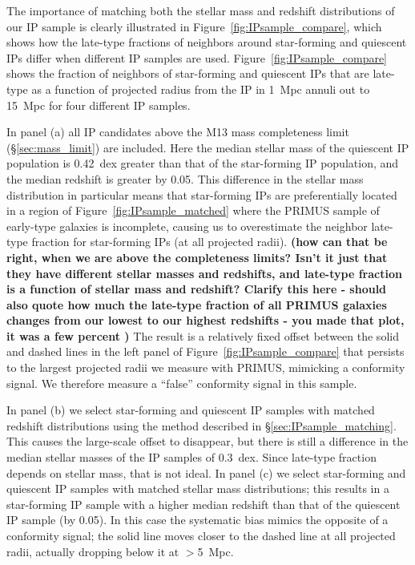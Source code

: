 The importance of matching both the stellar mass and redshift distributions of our 
IP sample is clearly illustrated in Figure~\ref{fig:IPsample_compare}, which shows 
how the late-type fractions of neighbors around star-forming and quiescent IPs 
differ when different IP samples are used.
Figure~\ref{fig:IPsample_compare} shows the fraction of neighbors of star-forming 
and quiescent IPs that are late-type as a function of projected radius from the 
IP in 1~Mpc annuli out to 15~Mpc for four different IP samples.
%

In panel (a) all IP candidates above the M13 mass completeness limit 
(\S\ref{sec:mass_limit}) are included.
Here the median stellar mass of the quiescent IP population is 0.42~dex greater 
than that of the star-forming IP population, and the median redshift is greater 
by 0.05.
This difference in the stellar mass distribution in particular means that 
star-forming IPs are preferentially located in a region of 
Figure~\ref{fig:IPsample_matched} where the PRIMUS sample of
early-type galaxies is incomplete, causing us to overestimate the neighbor late-type fraction for star-forming IPs (at all projected radii).
{\bf(how can that be right, when we are above the completeness limits?  Isn't it 
just that they have different stellar masses and redshifts, and late-type fraction is a function of stellar mass 
and redshift? Clarify this here - should also quote how much the late-type fraction of all PRIMUS galaxies changes from our lowest to our highest redshifts - you made that plot, it was a few percent )}
The result is a relatively fixed offset between the solid and dashed lines in the 
left panel of Figure~\ref{fig:IPsample_compare} that persists to the largest 
projected radii we measure with PRIMUS, mimicking a conformity signal.  We therefore
measure a ``false'' conformity signal in this sample.

In panel (b) we select star-forming and quiescent IP samples with matched redshift 
distributions using the method described in \S\ref{sec:IPsample_matching}.  This 
causes the large-scale offset to disappear, but there is still a difference in the 
median stellar masses of the IP samples of 0.3~dex.  Since late-type fraction depends on stellar mass, that is not ideal. 
In panel (c) we select star-forming and quiescent IP samples with matched stellar mass distributions; this results in a star-forming IP sample with a higher median 
redshift than that of the quiescent IP sample (by 0.05).
In this case the systematic bias mimics the opposite of a conformity signal; the solid line moves closer to the dashed line at all projected radii, actually dropping below it at $>$5~Mpc.

